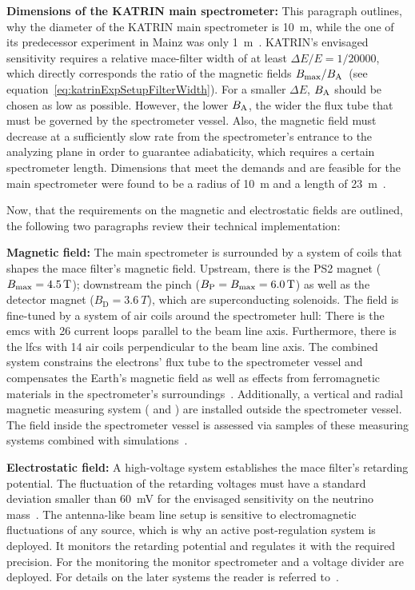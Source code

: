 {{\par \textbf{Dimensions of the KATRIN main spectrometer:} This paragraph outlines, why the diameter of the KATRIN main spectrometer is \SI{10}{m}, while the one of its predecessor experiment in Mainz was only \SI{1}{m}~\cite{Kraus2005}. KATRIN's envisaged sensitivity requires a relative \gls{mace}-filter width of at least $\Delta E/E = 1/20000$, which directly corresponds the ratio of the magnetic fields $B_\mathrm{max}/B_\mathrm{A}$~(see equation~\eqref{eq:katrinExpSetupFilterWidth}). For a smaller $\Delta E$, $B_\mathrm{A}$ should be chosen as low as possible. However, the lower $B_\mathrm{A}$, the wider the flux tube that must be governed by the spectrometer vessel. Also, the magnetic field must decrease at a sufficiently slow rate from the spectrometer's entrance to the analyzing plane in order to guarantee adiabaticity, which requires a certain spectrometer length. Dimensions that meet the demands and are feasible for the main spectrometer were found to be a radius of \SI{10}{m} and a length of \SI{23}{m}~\cite{Angrik:2005ep, Valerius2004}.}

Now, that the requirements on the magnetic and electrostatic fields are outlined, the following two paragraphs review their technical implementation:

{\par \textbf{Magnetic field:} The main spectrometer is surrounded by a system of coils that shapes the \gls{mace} filter's  magnetic field. Upstream, there is the PS2 magnet ($B_\mathrm{max}=\SI{4.5}{T}$); downstream the pinch ($B_\mathrm{P}=B_\mathrm{max}=\SI{6.0}{T}$) as well as the detector magnet ($B_\mathrm{D}=\SI{3.6}{T}$), which are superconducting solenoids. The field is fine-tuned by a system of air coils around the spectrometer hull: There is the \gls{emcs} with 26 current loops parallel to the beam line axis. Furthermore, there is the \gls{lfcs} with 14 air coils perpendicular to the beam line axis. The combined system constrains the electrons' flux tube to the spectrometer vessel and compensates the Earth's magnetic field as well as effects from ferromagnetic materials in the spectrometer's surroundings~\cite{Erhard2018}. Additionally, a vertical and radial magnetic measuring system ( and ) are installed outside the spectrometer vessel. The field inside the spectrometer vessel is assessed via samples of these measuring systems combined with simulations~\cite{Letnev2018}.}

{\par \textbf{Electrostatic field:} A high-voltage system establishes the \gls{mace} filter's retarding potential. The fluctuation of the retarding voltages must have a standard deviation smaller than \SI{60}{mV} for the envisaged sensitivity on the neutrino mass~\cite{Angrik:2005ep}. The antenna-like beam line setup is sensitive to electromagnetic fluctuations of any source, which is why an active post-regulation system is deployed. It monitors the retarding potential and regulates it with the required precision. For the monitoring the monitor spectrometer and a voltage divider are deployed. For details on the later systems the reader is referred to~\cite{Thuemmler2009,Erhard2014,Zboril2011}.}

}
